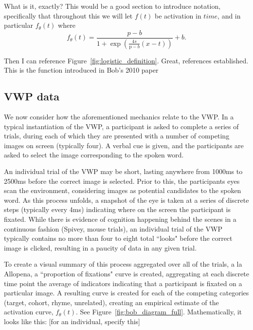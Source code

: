 \documentclass{article}
\begin{document}
What is it, exactly? This would be a good section to introduce notation, specifically that throughout this we will let $f(t)$ be activation in $time$, and in particular $f_{\theta}(t)$ where
\begin{equation} \label{eq:logistic}
f_{\theta}(t) = \frac{p-b}{1 + \exp \left(\frac{4s}{\text{p}-b} (x - t) \right)} + b.
\end{equation}

Then I can reference Figure~\ref{fig:logistic_definition}. Great, references established. This is the function introduced in Bob's 2010 paper \cite{mcmurray2010individual}

\subsection{VWP data}


We now consider how the aforementioned mechanics relate to the VWP. In a typical instantiation of the VWP, a participant is asked to complete a series of trials, during each of which they are presented with a number of competing images on screen (typically four). A verbal cue is given, and the participants are asked to select the image corresponding to the spoken word.

An individual trial of the VWP may be short, lasting anywhere from 1000ms to 2500ms before the correct image is selected. Prior to this, the participants eyes scan the environment, considering images as potential candidates to the spoken word. As this process unfolds, a snapshot of the eye is taken at a series of discrete steps (typically every 4ms) indicating where on the screen the participant is fixated. While there is evidence of cognition happening behind the scenes in a continuous fashion (Spivey, mouse trials), an individual trial of the VWP typically contains no more than four to eight total ``looks" before the correct image is clicked, resulting in a paucity of data in any given trial.

To create a visual summary of this process aggregated over all of the trials, a la Allopena, a ``proportion of fixations" curve is created, aggregating at each discrete time point the average of indicators indicating that a participant is fixated on a particular image. A resulting curve is created for each of the competing categories (target, cohort, rhyme, unrelated), creating an empirical estimate of the activation curve, $f_{\theta}(t)$. See Figure~\ref{fig:bob_diagram_full}. Mathematically, it looks like this: [for an individual, specify this]
\end{document}
